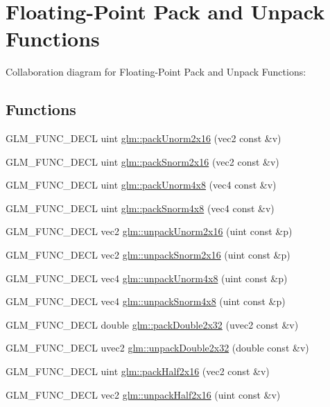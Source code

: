 \hypertarget{group__core__func__packing}{
\section{Floating-Point Pack and Unpack Functions}
\label{group__core__func__packing}
}


Collaboration diagram for Floating-Point Pack and Unpack Functions:\subsection*{Functions}
\begin{CompactItemize}
\item 
GLM\_\-FUNC\_\-DECL uint \hyperlink{group__core__func__packing_g0659ddaf09727551c7bf51655d2a65cf}{glm::packUnorm2x16} (vec2 const \&v)
\item 
GLM\_\-FUNC\_\-DECL uint \hyperlink{group__core__func__packing_g0c8005de240d6c4ca3d16c7bee25c622}{glm::packSnorm2x16} (vec2 const \&v)
\item 
GLM\_\-FUNC\_\-DECL uint \hyperlink{group__core__func__packing_g834ee9a9e73dcb0a7c1fc88143f3edb8}{glm::packUnorm4x8} (vec4 const \&v)
\item 
GLM\_\-FUNC\_\-DECL uint \hyperlink{group__core__func__packing_gfcf25acc0d361c6c696a433aa5dfd16b}{glm::packSnorm4x8} (vec4 const \&v)
\item 
GLM\_\-FUNC\_\-DECL vec2 \hyperlink{group__core__func__packing_gff327a2fca8abfe31b74b914b68ac5ec}{glm::unpackUnorm2x16} (uint const \&p)
\item 
GLM\_\-FUNC\_\-DECL vec2 \hyperlink{group__core__func__packing_ga3f9bd6a71d7bdfab090b9626f2466aa}{glm::unpackSnorm2x16} (uint const \&p)
\item 
GLM\_\-FUNC\_\-DECL vec4 \hyperlink{group__core__func__packing_g5d3c4d354b48a317935349dd62a8b8a5}{glm::unpackUnorm4x8} (uint const \&p)
\item 
GLM\_\-FUNC\_\-DECL vec4 \hyperlink{group__core__func__packing_g126a0deffef1f2d10dd67237981a870b}{glm::unpackSnorm4x8} (uint const \&p)
\item 
GLM\_\-FUNC\_\-DECL double \hyperlink{group__core__func__packing_gf728fdfb98ce34da6f968d9f6bf154d7}{glm::packDouble2x32} (uvec2 const \&v)
\item 
GLM\_\-FUNC\_\-DECL uvec2 \hyperlink{group__core__func__packing_g7e8cf88c278c18969c99af83bceed024}{glm::unpackDouble2x32} (double const \&v)
\item 
GLM\_\-FUNC\_\-DECL uint \hyperlink{group__core__func__packing_g082f6dd65f73a547ed3067ef00be036f}{glm::packHalf2x16} (vec2 const \&v)
\item 
GLM\_\-FUNC\_\-DECL vec2 \hyperlink{group__core__func__packing_g4051804cc2c930ba4ca73382b79edf1d}{glm::unpackHalf2x16} (uint const \&v)
\end{CompactItemize}


